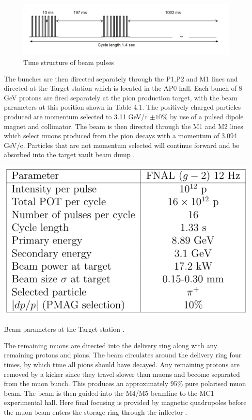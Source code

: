 \begin{figure}[th]
\centering
\includegraphics[scale=0.6]{Figures/beampulses}
\decoRule
\caption{Time structure of beam pulses}
\label{fig:beampulses}
\end{figure}

The bunches are then directed separately through the P1,P2 and M1 lines and directed at the Target station which is located in the AP0 hall. Each bunch of 8 GeV protons are fired separately at the pion production target, with the beam parameters at this position shown in Table 4.1. The positively charged particles produced are momentum selected to 3.11 GeV/c $\pm 10\%$ by use of a pulsed dipole magnet and collimator. The beam is then directed through the M1 and M2 lines which select muons produced from the pion decays with a momentum of 3.094 GeV/c. Particles that are not momentum selected will continue forward and be absorbed into the target vault beam dump \cite{Chap2Ref1}.


\begin{table}[th]
\centering
\includegraphics[scale=0.5]{Figures/BeamParameters}
\decoRule
\caption{Beam parameters at the Target station \cite{Reference29}.}
\label{fig:BeamParameters}
\end{table}

The remaining muons are directed into the delivery ring along with any remaining protons and pions. The beam circulates around the delivery ring four times, by which time all pions should have decayed. Any remaining protons are removed by a kicker since they travel slower than muons and become separated from the muon bunch. This produces an approximately 95$\%$ pure polarised muon beam. The beam is then guided into the M4/M5 beamline to the MC1 experimental hall. Here final focusing is provided by magnetic quadrupoles before the muon beam enters the storage ring through the inflector \cite{Reference22}. 

